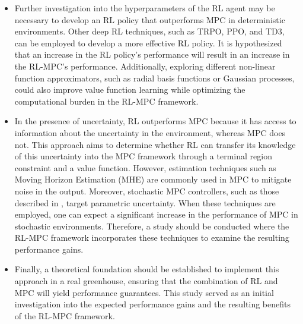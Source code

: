 \begin{itemize}
	\item Further investigation into the hyperparameters of the RL agent may be necessary to develop an RL policy that outperforms MPC in deterministic environments. Other deep RL techniques, such as TRPO, PPO, and TD3, can be employed to develop a more effective RL policy. It is hypothesized that an increase in the RL policy's performance will result in an increase in the RL-MPC's performance. Additionally, exploring different non-linear function approximators, such as radial basis functions or Gaussian processes, could also improve value function learning while optimizing the computational burden in the RL-MPC framework.
	\item In the presence of uncertainty, RL outperforms MPC because it has access to information about the uncertainty in the environment, whereas MPC does not. This approach aims to determine whether RL can transfer its knowledge of this uncertainty into the MPC framework through a terminal region constraint and a value function. However, estimation techniques such as Moving Horizon Estimation (MHE) are commonly used in MPC to mitigate noise in the output. Moreover, stochastic MPC controllers, such as those described in \cite{boersmaRobustSamplebasedModel2022}, target parametric uncertainty. When these techniques are employed, one can expect a significant increase in the performance of MPC in stochastic environments. Therefore, a study should be conducted where the RL-MPC framework incorporates these techniques to examine the resulting performance gains.
	\item Finally, a theoretical foundation should be established to implement this approach in a real greenhouse, ensuring that the combination of RL and MPC will yield performance guarantees. This study served as an initial investigation into the expected performance gains and the resulting benefits of the RL-MPC framework.
\end{itemize}







